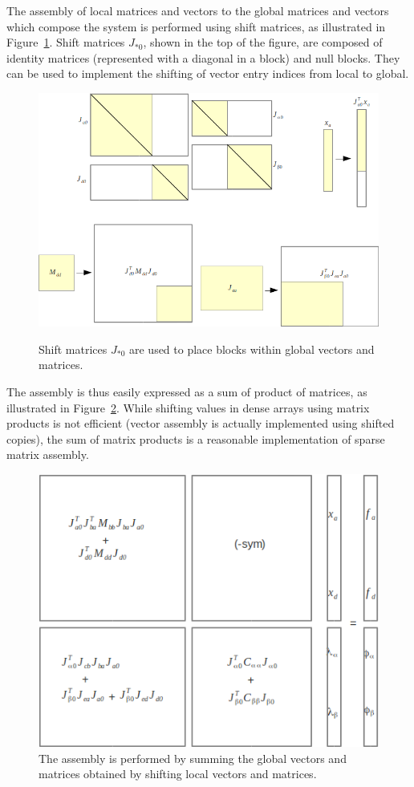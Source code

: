 The assembly of local matrices and vectors to the global matrices and vectors which compose the system is performed using shift matrices, as illustrated in Figure~\ref{fig shifting}.
Shift matrices $J_{*0}$, shown in the top of the figure, are composed of identity matrices (represented with a diagonal in a block) and null blocks. They can be used to implement the shifting of vector entry indices from local to global. 
\begin{figure}
\centering
 \includegraphics[width=0.69\linewidth]{system-shift.png}
\label{fig shifting}
\caption{Shift matrices $J_{*0}$ are used to place blocks within global vectors and matrices. }
\end{figure}
The assembly is thus easily expressed as a sum of product of matrices, as illustrated in Figure~\ref{fig assembly}. 
While shifting values in dense arrays using matrix products is not efficient (vector assembly is actually implemented using shifted copies), the sum of matrix products is a reasonable implementation of sparse matrix assembly.
\begin{figure}
\centering
 \includegraphics[width=0.6\linewidth]{system-assembly.png}
\caption{The assembly is performed by summing the global vectors and matrices obtained by shifting local vectors and matrices.}
\label{fig assembly}
\end{figure}


